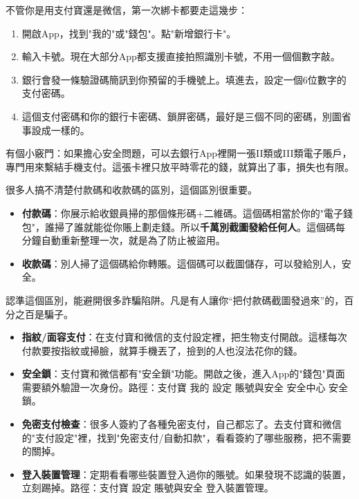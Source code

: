 


不管你是用支付寶還是微信，第一次綁卡都要走這幾步：

\begin{enumerate}
  \item 開啟App，找到"我的"或"錢包"。點"新增銀行卡"。
  \item 輸入卡號。現在大部分App都支援直接拍照識別卡號，不用一個個數字敲。
  \item 銀行會發一條驗證碼簡訊到你預留的手機號上。填進去，設定一個6位數字的支付密碼。
  \item 這個支付密碼和你的銀行卡密碼、鎖屏密碼，最好是三個不同的密碼，別圖省事設成一樣的。
\end{enumerate}

有個小竅門：如果擔心安全問題，可以去銀行App裡開一張II類或III類電子賬戶，專門用來繫結手機支付。這張卡裡只放平時零花的錢，就算出了事，損失也有限。


很多人搞不清楚付款碼和收款碼的區別，這個區別很重要。

\begin{itemize}
  \item \textbf{付款碼}：你展示給收銀員掃的那個條形碼+二維碼。這個碼相當於你的"電子錢包"，誰掃了誰就能從你賬上劃走錢。所以\textbf{千萬別截圖發給任何人}。這個碼每分鐘自動重新整理一次，就是為了防止被盜用。
  \item \textbf{收款碼}：別人掃了這個碼給你轉賬。這個碼可以截圖儲存，可以發給別人，安全。
\end{itemize}

認準這個區別，能避開很多詐騙陷阱。凡是有人讓你“把付款碼截圖發過來”的，百分之百是騙子。


\begin{itemize}
  \item \textbf{指紋/面容支付}：在支付寶和微信的支付設定裡，把生物支付開啟。這樣每次付款要按指紋或掃臉，就算手機丟了，撿到的人也沒法花你的錢。
  \item \textbf{安全鎖}：支付寶和微信都有"安全鎖"功能。開啟之後，進入App的"錢包"頁面需要額外驗證一次身份。路徑：支付寶 我的 設定 賬號與安全 安全中心 安全鎖。
  \item \textbf{免密支付檢查}：很多人簽約了各種免密支付，自己都忘了。去支付寶和微信的"支付設定"裡，找到"免密支付/自動扣款"，看看簽約了哪些服務，把不需要的關掉。
  \item \textbf{登入裝置管理}：定期看看哪些裝置登入過你的賬號。如果發現不認識的裝置，立刻踢掉。路徑：支付寶 設定 賬號與安全 登入裝置管理。
\end{itemize}

